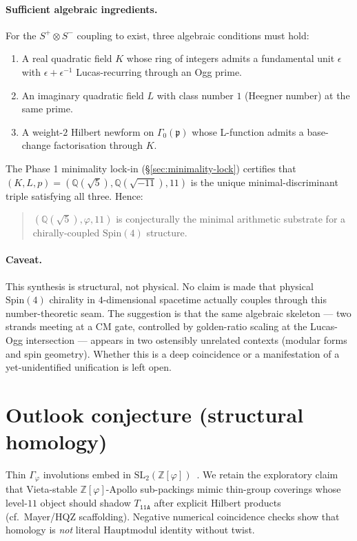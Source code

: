 \documentclass[11pt,a4paper]{article}
\theoremstyle{plain}
\theoremstyle{definition}
\theoremstyle{remark}
\numberwithin{equation}{section}
\providecommand{\Zp}{\ensuremath{\mathbb{Z}[\varphi]}}
\providecommand{\Qp}{\ensuremath{\mathbb{Q}(\sqrt{5})}}
\begin{document}
\paragraph{Sufficient algebraic ingredients.}
For the $S^{+}\otimes S^{-}$ coupling to exist, three algebraic conditions
must hold:
\begin{enumerate}
\item A real quadratic field $K$ whose ring of integers admits a fundamental
  unit $\epsilon$ with $\epsilon+\epsilon^{-1}$ Lucas-recurring through an Ogg prime.
\item An imaginary quadratic field $L$ with class number $1$ (Heegner number)
  at the same prime.
\item A weight-$2$ Hilbert newform on $\Gamma_{0}(\mathfrak{p})$ whose
  L-function admits a base-change factorisation through $K$.
\end{enumerate}
The Phase 1 minimality lock-in (\S\ref{sec:minimality-lock}) certifies
that $(K,L,p)=(\Qp,\mathbb{Q}(\sqrt{-11}),11)$ is the unique minimal-discriminant
triple satisfying all three.  Hence:
\begin{quote}
$(\Qp,\varphi,11)$ is conjecturally the minimal arithmetic
substrate for a chirally-coupled $\mathrm{Spin}(4)$ structure.
\end{quote}

\paragraph{Caveat.}  This synthesis is structural, not physical.  No claim
is made that physical $\mathrm{Spin}(4)$ chirality in $4$-dimensional
spacetime actually couples through this number-theoretic seam.  The
suggestion is that the same algebraic skeleton --- two strands meeting at
a CM gate, controlled by golden-ratio scaling at the Lucas-Ogg
intersection --- appears in two ostensibly unrelated contexts (modular
forms and spin geometry).  Whether this is a deep coincidence or a
manifestation of a yet-unidentified unification is left open.

\section{Outlook conjecture (structural homology)}
Thin $\Gamma_{\varphi}$ involutions embed in $\mathrm{SL}_{2}(\Zp)$~\cite{golden-tetrad}.
We retain the exploratory claim that Vieta-stable $\Zp$-Apollo sub-packings mimic
thin-group coverings whose level-$11$ object should shadow $T_{\texttt{11A}}$ after
explicit Hilbert products (cf.\ Mayer/HQZ scaffolding). Negative numerical coincidence
checks show that homology is \emph{not} literal Hauptmodul identity without twist.
\end{document}
